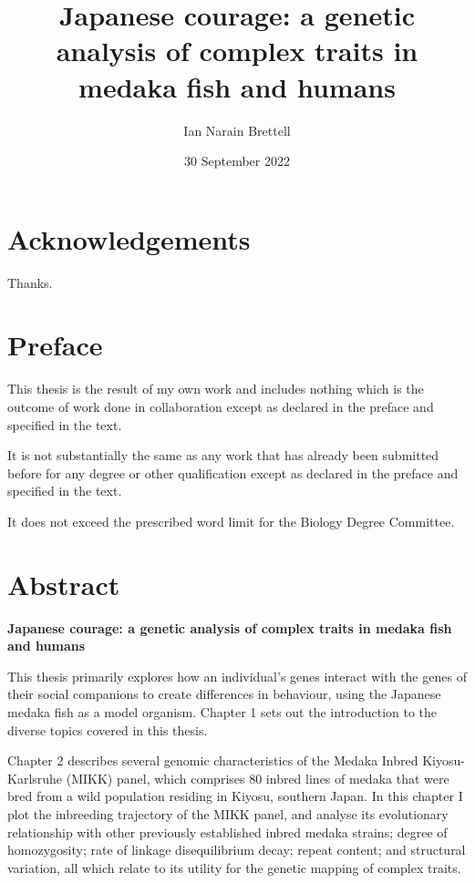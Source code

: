 \documentclass[
]{book}
\title{Japanese courage: a genetic analysis of complex traits in medaka fish and humans}
\author{Ian Narain Brettell}
\date{30 September 2022}
\begin{document}
\maketitle

{
\setcounter{tocdepth}{1}
\tableofcontents
}
\hypertarget{acknowledgements}{%
\chapter*{Acknowledgements}\label{acknowledgements}}

Thanks.

\hypertarget{preface}{%
\chapter*{Preface}\label{preface}}

This thesis is the result of my own work and includes nothing which is the outcome of work done in collaboration except as declared in the preface and specified in the text.

It is not substantially the same as any work that has already been submitted before for any degree or other qualification except as declared in the preface and specified in the text.

It does not exceed the prescribed word limit for the Biology Degree Committee.

\hypertarget{abstract}{%
\chapter*{Abstract}\label{abstract}}

\textbf{Japanese courage: a genetic analysis of complex traits in medaka fish and humans}

This thesis primarily explores how an individual's genes interact with the genes of their social companions to create differences in behaviour, using the Japanese medaka fish as a model organism. Chapter 1 sets out the introduction to the diverse topics covered in this thesis.

Chapter 2 describes several genomic characteristics of the Medaka Inbred Kiyosu-Karlsruhe (MIKK) panel, which comprises 80 inbred lines of medaka that were bred from a wild population residing in Kiyosu, southern Japan. In this chapter I plot the inbreeding trajectory of the MIKK panel, and analyse its evolutionary relationship with other previously established inbred medaka strains; degree of homozygosity; rate of linkage disequilibrium decay; repeat content; and structural variation, all which relate to its utility for the genetic mapping of complex traits.
\end{document}
